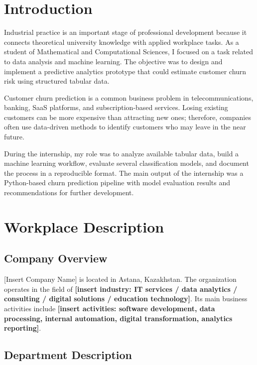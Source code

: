 \documentclass[12pt,a4paper]{article}
\newcommand{\companyName}{[Insert Company Name]}
\newcommand{\companyLocation}{Astana, Kazakhstan}
\begin{document}
\newpage

\section{Introduction}

Industrial practice is an important stage of professional development because it connects theoretical university knowledge with applied workplace tasks. As a student of Mathematical and Computational Sciences, I focused on a task related to data analysis and machine learning. The objective was to design and implement a predictive analytics prototype that could estimate customer churn risk using structured tabular data.

Customer churn prediction is a common business problem in telecommunications, banking, SaaS platforms, and subscription-based services. Losing existing customers can be more expensive than attracting new ones; therefore, companies often use data-driven methods to identify customers who may leave in the near future.

During the internship, my role was to analyze available tabular data, build a machine learning workflow, evaluate several classification models, and document the process in a reproducible format. The main output of the internship was a Python-based churn prediction pipeline with model evaluation results and recommendations for further development.

\section{Workplace Description}

\subsection{Company Overview}

\companyName{} is located in \companyLocation{}. The organization operates in the field of \textbf{[insert industry: IT services / data analytics / consulting / digital solutions / education technology]}. Its main business activities include \textbf{[insert activities: software development, data processing, internal automation, digital transformation, analytics reporting]}.

\subsection{Department Description}
\end{document}
